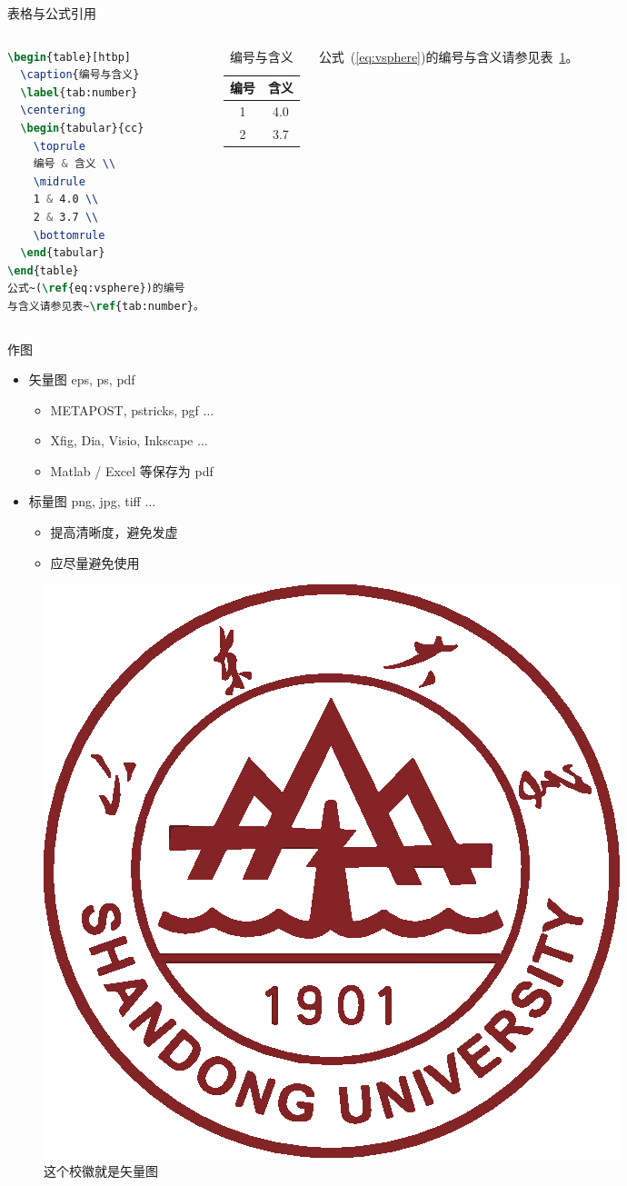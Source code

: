 \documentclass[aspectratio=169]{beamer}
\begin{document}
\begin{frame}[fragile]{表格与公式引用}
    \begin{columns}
\begin{lstlisting}[language=TeX, basicstyle=\tiny, xleftmargin=2em, xrightmargin=2em]
\begin{table}[htbp]
  \caption{编号与含义}
  \label{tab:number}
  \centering
  \begin{tabular}{cc}
    \toprule
    编号 & 含义 \\
    \midrule
    1 & 4.0 \\
    2 & 3.7 \\
    \bottomrule
  \end{tabular}
\end{table}
公式~(\ref{eq:vsphere})的编号
与含义请参见表~\ref{tab:number}。
\end{lstlisting}
        \begin{table}[htpb]
            \centering
            \caption{编号与含义}
            \label{tab:number}
            \begin{tabular}{cc}
                \toprule
                编号 & 含义 \\
                \midrule
                1 & 4.0 \\
                2 & 3.7 \\
                \bottomrule
            \end{tabular}
        \end{table}
        公式~(\ref{eq:vsphere})的编号与含义请参见表~\ref{tab:number}。
    \end{columns}
\end{frame}

\begin{frame}{作图}
    \begin{itemize}
        \item 矢量图 eps, ps, pdf
        \begin{itemize}
            \item METAPOST, pstricks, pgf $\ldots$
            \item Xfig, Dia, Visio, Inkscape $\ldots$
            \item Matlab / Excel 等保存为 pdf
        \end{itemize}
        \item 标量图 png, jpg, tiff $\ldots$
        \begin{itemize}
            \item 提高清晰度，避免发虚
            \item 应尽量避免使用
        \end{itemize}
    \end{itemize}
    \begin{figure}[htpb]
        \centering
        \includegraphics[width=0.1\linewidth]{img/Example/SDU.eps}
        \caption{这个校徽就是矢量图}
    \end{figure}
\end{frame}
\end{document}
